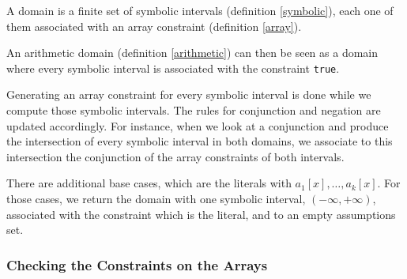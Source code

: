 \begin{definition}[Domain]

A domain is a finite set of symbolic intervals (definition
\ref{symbolic}), each  one of them associated with an array constraint
(definition \ref{array}).

\label{domain}

\end{definition}

An arithmetic domain (definition \ref{arithmetic}) can then be seen as a
domain where every symbolic interval is associated with the constraint
\texttt{true}.

Generating an array constraint for every symbolic interval is done while we compute those symbolic
intervals. The rules for conjunction and negation are updated accordingly. For instance, when we
look at a conjunction and produce the intersection of every symbolic interval in both domains, we
associate to this intersection the conjunction of the array constraints of both intervals.

There are additional base cases, which are the literals with $a_1[x], \ldots, a_k[x]$. For those
cases, we return the domain with one symbolic interval, $(-\infty, +\infty)$,
associated with the
constraint which is the literal, and to an empty assumptions set.

\subsubsection{Checking the Constraints on the Arrays}


